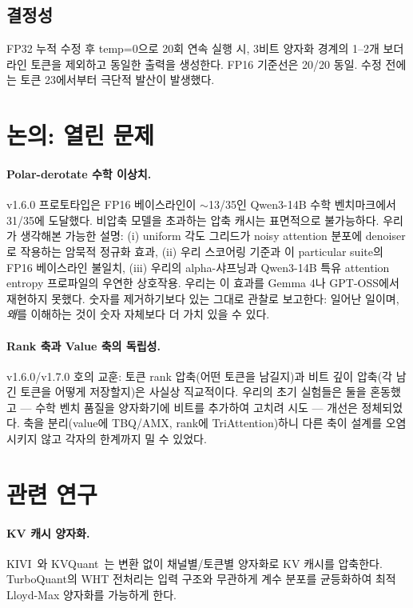 \documentclass[10pt,twocolumn]{article}
\begin{document}
\subsection{결정성}

FP32 누적 수정 후 temp=0으로 20회 연속 실행 시, 3비트 양자화 경계의 1--2개 보더라인 토큰을 제외하고 동일한 출력을 생성한다. FP16 기준선은 20/20 동일. 수정 전에는 토큰 23에서부터 극단적 발산이 발생했다.

\section{논의: 열린 문제}
\label{sec:discussion}

\paragraph{Polar-derotate 수학 이상치.} v1.6.0 프로토타입은 FP16 베이스라인이 $\sim$13/35인 Qwen3-14B 수학 벤치마크에서 31/35에 도달했다. 비압축 모델을 초과하는 압축 캐시는 표면적으로 불가능하다. 우리가 생각해본 가능한 설명: (i) uniform 각도 그리드가 noisy attention 분포에 denoiser로 작용하는 암묵적 정규화 효과, (ii) 우리 스코어링 기준과 이 particular suite의 FP16 베이스라인 불일치, (iii) 우리의 alpha-샤프닝과 Qwen3-14B 특유 attention entropy 프로파일의 우연한 상호작용. 우리는 이 효과를 Gemma 4나 GPT-OSS에서 재현하지 못했다. 숫자를 제거하기보다 있는 그대로 관찰로 보고한다: 일어난 일이며, \emph{왜}를 이해하는 것이 숫자 자체보다 더 가치 있을 수 있다.

\paragraph{Rank 축과 Value 축의 독립성.} v1.6.0/v1.7.0 호의 교훈: 토큰 rank 압축(어떤 토큰을 남길지)과 비트 깊이 압축(각 남긴 토큰을 어떻게 저장할지)은 사실상 직교적이다. 우리의 초기 실험들은 둘을 혼동했고 --- 수학 벤치 품질을 양자화기에 비트를 추가하여 고치려 시도 --- 개선은 정체되었다. 축을 분리(value에 TBQ/AMX, rank에 TriAttention)하니 다른 축이 설계를 오염시키지 않고 각자의 한계까지 밀 수 있었다.

\section{관련 연구}
\label{sec:related}

\paragraph{KV 캐시 양자화.} KIVI~\cite{kivi2024}와 KVQuant~\cite{kvquant2024}는 변환 없이 채널별/토큰별 양자화로 KV 캐시를 압축한다. TurboQuant의 WHT 전처리는 입력 구조와 무관하게 계수 분포를 균등화하여 최적 Lloyd-Max 양자화를 가능하게 한다.
\end{document}
